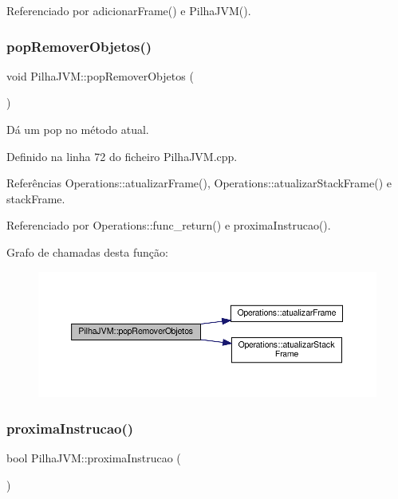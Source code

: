 Referenciado por adicionar\+Frame() e Pilha\+J\+V\+M().

\mbox{\label{classPilhaJVM_a4f83f8d59b436cb1813a2a35e1538045}} 
\subsubsection{\texorpdfstring{pop\+Remover\+Objetos()}{popRemoverObjetos()}}
{\footnotesize\ttfamily void Pilha\+J\+V\+M\+::pop\+Remover\+Objetos (\begin{DoxyParamCaption}{ }\end{DoxyParamCaption})}



Dá um pop no método atual. 



Definido na linha 72 do ficheiro Pilha\+J\+V\+M.\+cpp.



Referências Operations\+::atualizar\+Frame(), Operations\+::atualizar\+Stack\+Frame() e stack\+Frame.



Referenciado por Operations\+::func\+\_\+return() e proxima\+Instrucao().

Grafo de chamadas desta função\+:\nopagebreak
\begin{figure}[H]
\begin{center}
\leavevmode
\includegraphics[width=350pt]{classPilhaJVM_a4f83f8d59b436cb1813a2a35e1538045_cgraph}
\end{center}
\end{figure}
\mbox{\label{classPilhaJVM_a914a4707e58e23e8913fcdc0c53f8c5c}} 
\subsubsection{\texorpdfstring{proxima\+Instrucao()}{proximaInstrucao()}}
{\footnotesize\ttfamily bool Pilha\+J\+V\+M\+::proxima\+Instrucao (\begin{DoxyParamCaption}{ }\end{DoxyParamCaption})\hspace{0.3cm}{\ttfamily [private]}}



